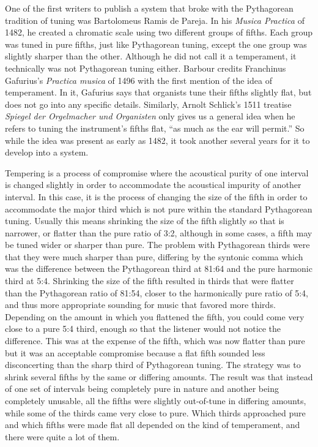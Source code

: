 One of the first writers to publish a system that broke with the Pythagorean
tradition of tuning was Bartolomeus Ramis de Pareja.  In his \textit{Musica Practica} of
1482, he created a chromatic scale using two different groups of fifths.  Each group was
tuned in pure fifths, just like Pythagorean tuning, except the one group was slightly
sharper than the other. \autocite[88]{MB:1}  Although he did not call it a temperament, it
technically was not Pythagorean tuning either.  Barbour credits Franchinus Gafurius's
\textit{Practica musica} of 1496 with the first mention of the idea of temperament.  In
it, Gafurius says that organists tune their fifths slightly flat, but does not go into any
specific details.\autocite[25]{MB:1} Similarly, Arnolt Schlick's 1511 treatise
\textit{Spiegel der Orgelmacher und Organisten} only gives us a general idea when he
refers to tuning the instrument's fifths flat, ``as much as the ear will permit.''
\autocite[202]{RR:1}  So while the idea was present as early as 1482, it took another
several years for it to develop into a system.

Tempering is a process of compromise where the acoustical purity of one interval is
changed slightly in order to accommodate the acoustical impurity of another interval.
In this case, it is the process of changing the size of the fifth in order to
accommodate the major third which is not pure within the standard Pythagorean tuning.
Usually this means shrinking the size of the fifth slightly so that is narrower, or
flatter than the pure ratio of 3:2, although in some cases, a fifth may be tuned wider or
sharper than pure. The problem with Pythagorean thirds were that they were much sharper
than pure, differing by the syntonic comma which was the difference between the
Pythagorean third at 81:64 and the pure harmonic third at 5:4. Shrinking the size of the
fifth resulted in thirds that were flatter than the Pythagorean ratio of 81:54, closer to
the harmonically pure ratio of 5:4, and thus more appropriate sounding for music that
favored more thirds. Depending on the amount in which you flattened the fifth, you could
come very close to a pure 5:4 third, enough so that the listener would not notice the
difference.  This was at the expense of the fifth, which was now flatter than pure but it
was an acceptable compromise because a flat fifth sounded less disconcerting than the
sharp third of Pythagorean tuning.  The strategy was to shrink several fifths by the same
or differing amounts. The result was that instead of one set of intervals being completely
pure in nature and another being completely unusable, all the fifths were slightly
out-of-tune in differing amounts, while some of the thirds came very close to pure. Which
thirds approached pure and which fifths were made flat all depended on the kind of
temperament, and there were quite a lot of them.

